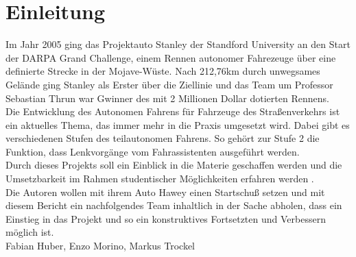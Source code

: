 \section{Einleitung}
Im Jahr 2005 ging das Projektauto Stanley der Standford University an den Start
der DARPA Grand Challenge, einem Rennen autonomer Fahrezeuge über eine
definierte Strecke in der Mojave-Wüste. Nach 212,76km durch unwegsames Gelände
ging Stanley als Erster über die Ziellinie und das Team um Professor Sebastian
Thrun war Gwinner des mit 2 Millionen Dollar dotierten Rennens.\\
Die Entwicklung des Autonomen Fahrens für Fahrzeuge des Straßenverkehrs ist ein
aktuelles Thema, das immer mehr in die Praxis umgesetzt wird. Dabei gibt es
verschiedenen Stufen des teilautonomen Fahrens. So gehört zur Stufe 2 die
Funktion, dass Lenkvorgänge vom Fahrassistenten ausgeführt werden.\\
Durch dieses Projekts soll ein Einblick in die Materie geschaffen
werden und die Umsetzbarkeit im Rahmen studentischer Möglichkeiten erfahren
werden .\\
Die Autoren wollen mit ihrem Auto Hawey einen Startschuß setzen und mit diesem
Bericht ein nachfolgendes Team inhaltlich in der Sache abholen, dass ein
Einstieg in das Projekt und so ein konstruktives Fortsetzten und Verbessern 
möglich ist.\\

Fabian Huber, Enzo Morino, Markus Trockel

